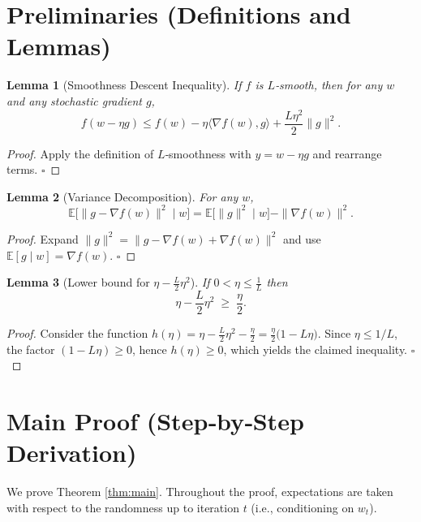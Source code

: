\documentclass[11pt]{article}
\newtheorem{lemma}{Lemma}
\begin{document}
\newpage
\section*{Preliminaries (Definitions and Lemmas)}
\begin{lemma}[Smoothness Descent Inequality]\label{lem:smooth}
If $f$ is $L$‑smooth, then for any $w$ and any stochastic gradient $g$,
\[
f(w-\eta g)\le f(w)-\eta\langle\nabla f(w),g\rangle+\frac{L\eta^{2}}{2}\|g\|^{2}.
\]
\end{lemma}
\begin{proof}
Apply the definition of $L$‑smoothness with $y=w-\eta g$ and rearrange terms. \hfill $\square$
\end{proof}

\begin{lemma}[Variance Decomposition]\label{lem:variance}
For any $w$,
\[
\mathbb{E}\big[\|g-\nabla f(w)\|^{2}\mid w\big]
=\mathbb{E}\big[\|g\|^{2}\mid w\big]-\|\nabla f(w)\|^{2}.
\]
\end{lemma}
\begin{proof}
Expand $\|g\|^{2}=\|g-\nabla f(w)+\nabla f(w)\|^{2}$ and use $\mathbb{E}[g\mid w]=\nabla f(w)$. \hfill $\square$
\end{proof}

\begin{lemma}[Lower bound for $\eta-\frac{L}{2}\eta^{2}$]\label{lem:lb}
If $0<\eta\le\frac{1}{L}$ then
\[
\eta-\frac{L}{2}\eta^{2}\;\ge\;\frac{\eta}{2}.
\]
\end{lemma}
\begin{proof}
Consider the function $h(\eta)=\eta-\frac{L}{2}\eta^{2}-\frac{\eta}{2}
=\frac{\eta}{2}\bigl(1-L\eta\bigr)$.  
Since $\eta\le 1/L$, the factor $(1-L\eta)\ge0$, hence $h(\eta)\ge0$, which yields the claimed inequality. \hfill $\square$
\end{proof}

\section*{Main Proof (Step‑by‑Step Derivation)}
We prove Theorem \ref{thm:main}. Throughout the proof, expectations are taken with respect to the randomness up to iteration $t$ (i.e., conditioning on $w_t$).
\end{document}
